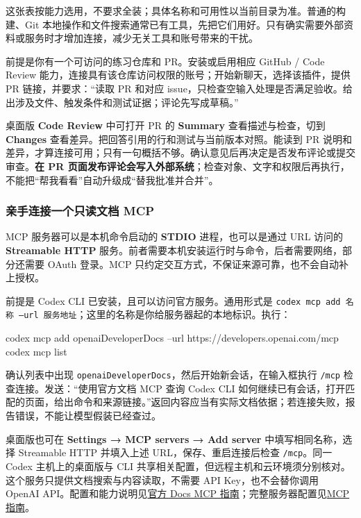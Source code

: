 这张表按能力选用，不要求全装；具体名称和可用性以当前目录为准。普通的构建、Git 本地操作和文件搜索通常已有工具，先把它们用好。只有确实需要外部资料或服务时才增加连接，减少无关工具和账号带来的干扰。

\begin{example}
前提是你有一个可访问的练习仓库和 PR。安装或启用相应 GitHub / Code Review 能力，连接具有该仓库访问权限的账号；开始新聊天，选择该插件，提供 PR 链接，并要求：“读取 PR 和对应 issue，只检查空输入处理是否满足验收。给出涉及文件、触发条件和测试证据；评论先写成草稿。”

桌面版 \textbf{Code Review} 中可打开 PR 的 \textbf{Summary} 查看描述与检查，切到 \textbf{Changes} 查看差异。把回答引用的行和测试与当前版本对照。能读到 PR 说明和差异，才算连接可用；只有一句概括不够。确认意见后再决定是否发布评论或提交审查。\textbf{在 PR 页面发布评论会写入外部系统}；检查对象、文字和权限后再执行，不能把“帮我看看”自动升级成“替我批准并合并”。
\end{example}

\subsubsection{亲手连接一个只读文档 MCP}

MCP 服务器可以是本机命令启动的 \textbf{STDIO} 进程，也可以是通过 URL 访问的 \textbf{Streamable HTTP} 服务。前者需要本机安装运行时与命令，后者需要网络，部分还需要 OAuth 登录。MCP 只约定交互方式，不保证来源可靠，也不会自动补上授权。

\begin{example}
前提是 Codex CLI 已安装，且可以访问官方服务。通用形式是 \texttt{codex mcp add 名称 --url 服务地址}；这里的名称是你给服务器起的本地标识。执行：
\begin{tbash}
codex mcp add openaiDeveloperDocs --url https://developers.openai.com/mcp
codex mcp list
\end{tbash}
确认列表中出现 \texttt{openaiDeveloperDocs}，然后开始新会话，在输入框执行 \texttt{/mcp} 检查连接。发送：“使用官方文档 MCP 查询 Codex CLI 如何继续已有会话，打开匹配的页面，给出命令和来源链接。”返回内容应当有实际文档依据；若连接失败，报告错误，不能让模型假装已经查过。

桌面版也可在 \textbf{Settings → MCP servers → Add server} 中填写相同名称，选择 Streamable HTTP 并填入上述 URL，保存、重启连接后检查 \texttt{/mcp}。同一 Codex 主机上的桌面版与 CLI 共享相关配置，但远程主机和云环境须分别核对。这个服务只提供文档搜索与内容读取，不需要 API Key，也不会替你调用 OpenAI API。配置和能力说明见\href{https://developers.openai.com/learn/docs-mcp}{官方 Docs MCP 指南}；完整服务器配置见\href{https://learn.chatgpt.com/docs/extend/mcp}{MCP 指南}。
\end{example}

